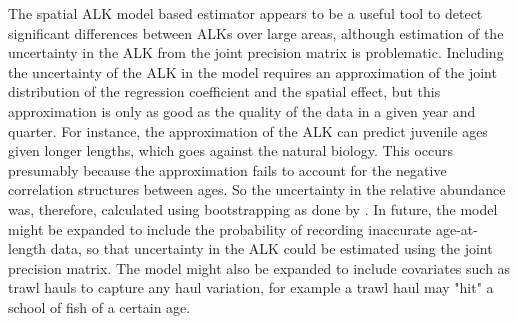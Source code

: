 \documentclass[a4paper 12pt]{article}
\numberwithin{equation}{section}
\begin{document}
{%

The spatial ALK model based estimator appears to be a useful tool to detect significant differences between ALKs over large areas, although estimation of the uncertainty in the ALK from the joint precision matrix is problematic. Including the uncertainty of the ALK in the model requires an approximation of the joint distribution of the regression coefficient and the spatial effect, but this approximation is only as good as the quality of the data in a given year and quarter. For instance, the approximation of the ALK can predict juvenile ages given longer lengths, which goes against the natural biology. This occurs presumably because the approximation fails to account for the negative correlation structures between ages. So the uncertainty in the relative abundance was, therefore, calculated using bootstrapping as done by \citet{berg2012spatial,berg2014evaluation}. In future, the model might be expanded to include the probability of recording inaccurate age-at-length data, so that uncertainty in the ALK could be estimated using the joint precision matrix. The model might also be expanded to include covariates such as trawl hauls to capture any haul variation, for example a trawl haul may "hit" a school of fish  of a certain age.

}
\end{document}
